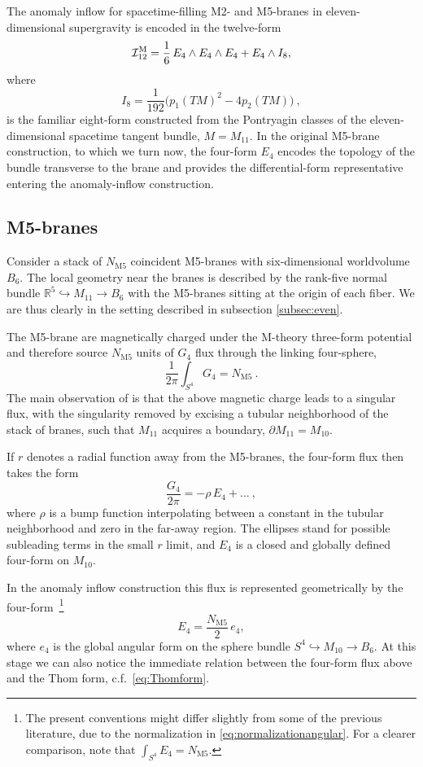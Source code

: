 \documentclass[11pt,a4paper]{article}
\def\cI{{\cal I}}
\theoremstyle{definition}
\theoremstyle{identity}
\theoremstyle{remark}
\newcommand{\be}{\begin{equation}}
\newcommand{\ee}{\end{equation}}
\begin{document}
The anomaly inflow for spacetime-filling M2- and M5-branes in eleven-dimensional supergravity is
encoded in the twelve-form~\cite{Witten:1996hc,Freed:1998tg,Harvey:1998bx}
\be
\label{eq:I12M}
\cI_{12}^{\rm M}
=
\frac16\,E_4\wedge E_4\wedge E_4
+
E_4\wedge I_8,
\ee
where
\be
I_8
=
\frac1{192}
\bigl(p_1(TM)^2-4p_2(TM)\bigr)\ ,
\ee
is the familiar eight-form constructed from the Pontryagin classes of the eleven-dimensional
spacetime tangent bundle, $M = M_{11}$. In the original M5-brane construction, to which we turn now, the four-form $E_4$ encodes the topology of the bundle transverse to the brane and provides the differential-form representative entering the anomaly-inflow
construction.


\subsection{M5-branes}
\label{sec:M5}

Consider a stack of $N_\text{M5}$ coincident M5-branes with six-dimensional worldvolume $B_6$. The local
geometry near the branes is described by the rank-five normal bundle $\mathbb{R}^5 \hookrightarrow M_{11} \longrightarrow B_6$ with the M5-branes sitting at the origin of each fiber. We are thus clearly in the setting described in subsection \ref{subsec:even}.

The M5-brane are magnetically charged under the M-theory three-form potential and therefore
source $N_\text{M5}$ units of $G_4$ flux through the linking four-sphere,
\be
\frac1{2\pi}\int_{S^4}G_4=N_\text{M5}\ .
\ee
The main observation of \cite{Harvey:1998bx,Freed:1998tg} is that the above magnetic charge leads to a singular flux, with the singularity removed by excising a tubular neighborhood of the stack of branes, such that $M_{11}$ acquires a boundary, $\partial M_{11} = M_{10}$. 


If $r$ denotes a radial function away from the M5-branes, the four-form flux then takes the form
\be
    \frac{G_4}{2\pi} = - \rho\, E_4 + \dots\ ,
\ee
where $\rho$ is a bump function interpolating between a constant in the tubular neighborhood and zero in the far-away region. The ellipses stand for possible subleading terms in the small $r$ limit, and $E_4$ is a closed and globally defined four-form on $M_{10}$. 

In the anomaly inflow construction this flux is represented geometrically by the four-form~\footnote{The present conventions might differ slightly from some of the previous literature, due to the normalization in \eqref{eq:normalizationangular}. For a clearer comparison, note that $\int_{S^4} E_4 = N_\text{M5}$.}
\be
E_4=\frac{N_\text{M5}}2\, e_4 ,
\ee
where $e_4$ is the global angular form on the sphere bundle $S^4\hookrightarrow M_{10}\longrightarrow B_6$. At this stage we can also notice the immediate relation between the four-form flux above and the Thom form, c.f.\ \eqref{eq:Thomform}.
\end{document}
